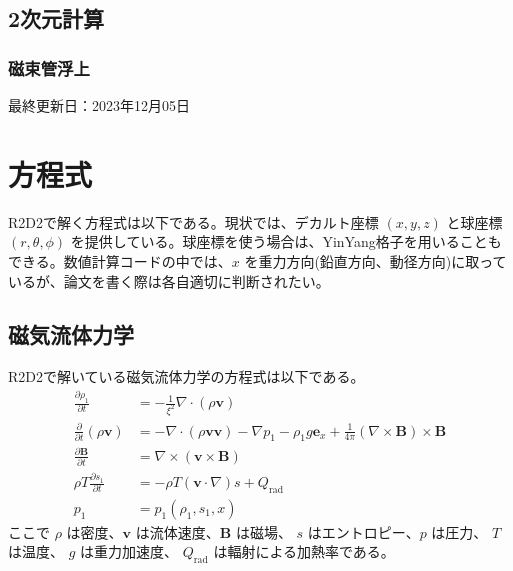 \documentclass[letterpaper,10pt,dvipdfmx,report]{sphinxmanual}
\begin{document}
\section{2次元計算}
\label{\detokenize{typical_case:id13}}

\subsection{磁束管浮上}
\label{\detokenize{typical_case:id14}}
\sphinxAtStartPar
最終更新日：2023年12月05日

\sphinxstepscope


\chapter{方程式}
\label{\detokenize{equation:id1}}\label{\detokenize{equation::doc}}
\sphinxAtStartPar
R2D2で解く方程式は以下である。現状では、デカルト座標 \((x,y,z)\)  と球座標 \((r,\theta,\phi)\) を提供している。球座標を使う場合は、Yin\sphinxhyphen{}Yang格子を用いることもできる。数値計算コードの中では、\(x\) を重力方向(鉛直方向、動径方向)に取っているが、論文を書く際は各自適切に判断されたい。


\section{磁気流体力学}
\label{\detokenize{equation:id2}}
\sphinxAtStartPar
R2D2で解いている磁気流体力学の方程式は以下である。
\begin{equation*}
\begin{split}\frac{\partial \rho_1}{\partial t} &= - \frac{1}{\xi^2}\nabla\cdot
\left(\rho \boldsymbol{v}\right) \\
\frac{\partial}{\partial t}\left(\rho \boldsymbol{v}\right) &=
-\nabla\cdot\left(\rho\boldsymbol{vv}\right)
- \nabla p_1 - \rho_1 g\boldsymbol{e}_x
+\frac{1}{4\pi}\left(\nabla\times\boldsymbol{B}\right)
\times\boldsymbol{B} \\
\frac{\partial \boldsymbol{B}}{\partial t} &=
\nabla\times\left(\boldsymbol{v\times B}\right)
\\
\rho T \frac{\partial s_1}{\partial t} &= -\rho T
\left(\boldsymbol{v}\cdot\nabla\right) s + Q_\mathrm{rad} \\
p_1 &= p_1(\rho_1,s_1,x)\end{split}
\end{equation*}
\sphinxAtStartPar
ここで \(\rho\) は密度、\(\boldsymbol{v}\) は流体速度、\(\boldsymbol{B}\) は磁場、 \(s\) はエントロピー、\(p\) は圧力、 \(T\) は温度、 \(g\) は重力加速度、 \(Q_\mathrm{rad}\) は輻射による加熱率である。
\end{document}
